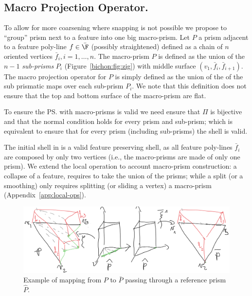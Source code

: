 \subsection{Macro Projection Operator.}\label{cumin:sec:macro}
To allow for more coarsening where snapping is not possible we propose to ``group'' prism next to a feature into one big macro-prism.
Let $P$ a prism adjacent to a feature poly-line $f\in\bar\F$ (possibly straightened) defined as a chain of $n$ oriented vertices $\bar f_i, i=1,\dots,n$. The macro-prism $P$ is defined as the union of the $n-1$ \emph{sub-prisms} $P_i$ (Figure~\ref{bichon:fig:zig}) with middle surface $(v_1, \bar f_i, \bar f_{i+1})$. The macro projection operator for $P$ is simply defined as the union of the of the sub prismatic maps over each sub-prism $P_i$. We note that this definition does not ensure that the top and bottom surface of the macro-prism are flat.


To ensure the \ps{} with macro-prisms is valid we need ensure that $\Pi$ is bijective and that the normal condition holds for every prism and sub-prism; which is equivalent to ensure that for every prism (including sub-prisms) the shell is valid.

The initial shell in \cite{jiang2020bijective} is a valid feature preserving shell, as all feature poly-lines $\bar f_i$ are composed by only two vertices (i.e., the macro-prisms are made of only one prism). We extend the local operation to account macro-prism construction: a collapse of a feature, requires to take the union of the prisms; while a split (or a smoothing) only requires splitting (or sliding a vertex) a macro-prism (Appendix~\ref{app:local-ops}).


\begin{figure}
    \centering
    \includegraphics[width=\linewidth]{curve_meshing_in_shell_tex/figs/mappings}
    \caption{Example of mapping from $P$ to $\bar P$ passing through a reference prism $\hat P$.}
    \label{bichon:fig:ref-mapping}
\end{figure}